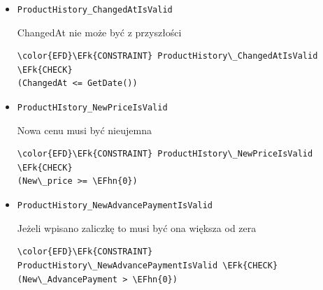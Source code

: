 \documentclass[11pt]{article}
\newcommand{\EFk}[1]{\textcolor{EFk}{\textbf{#1}}} %
\newcommand{\EFhn}[1]{\textcolor{EFhn}{#1}} %
\begin{document}
\begin{itemize}
\item \texttt{ProductHistory\_ChangedAtIsValid}

ChangedAt nie może być z przyszłości
\begin{Code}
\begin{Verbatim}
\color{EFD}\EFk{CONSTRAINT} ProductHistory\_ChangedAtIsValid \EFk{CHECK}
(ChangedAt <= GetDate())
\end{Verbatim}
\end{Code}
\item \texttt{ProductHIstory\_NewPriceIsValid}

Nowa cenu musi być nieujemna
\begin{Code}
\begin{Verbatim}
\color{EFD}\EFk{CONSTRAINT} ProductHIstory\_NewPriceIsValid \EFk{CHECK}
(New\_price >= \EFhn{0})
\end{Verbatim}
\end{Code}
\item \texttt{ProductHistory\_NewAdvancePaymentIsValid}

Jeżeli wpisano zaliczkę to musi być ona większa od zera
\begin{Code}
\begin{Verbatim}
\color{EFD}\EFk{CONSTRAINT} ProductHistory\_NewAdvancePaymentIsValid \EFk{CHECK}
(New\_AdvancePayment > \EFhn{0})
\end{Verbatim}
\end{Code}
\end{itemize}
\end{document}
